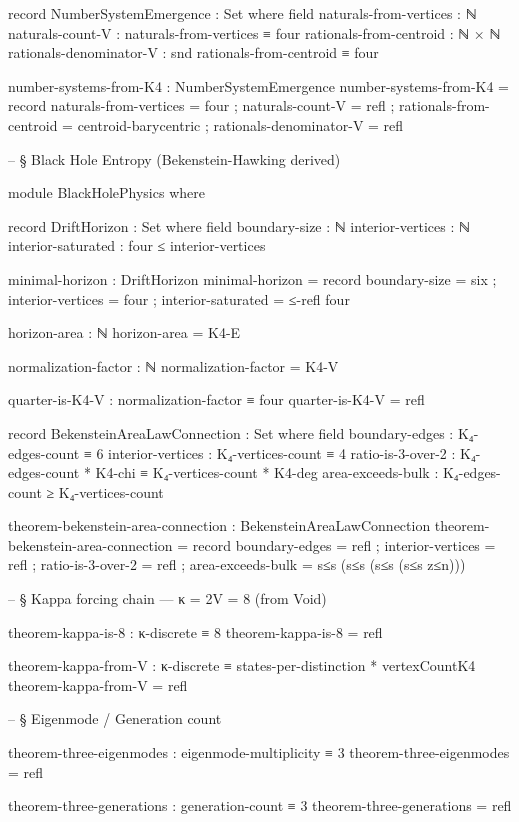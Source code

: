 \documentclass[11pt,a4paper]{book}
\begin{document}
\begin{code}
record NumberSystemEmergence : Set where
  field
    naturals-from-vertices : ℕ
    naturals-count-V : naturals-from-vertices ≡ four
    rationals-from-centroid : ℕ × ℕ
    rationals-denominator-V : snd rationals-from-centroid ≡ four

number-systems-from-K4 : NumberSystemEmergence
number-systems-from-K4 = record
  { naturals-from-vertices = four ; naturals-count-V = refl
  ; rationals-from-centroid = centroid-barycentric ; rationals-denominator-V = refl }

-- § Black Hole Entropy (Bekenstein-Hawking derived)

module BlackHolePhysics where

  record DriftHorizon : Set where
    field
      boundary-size : ℕ
      interior-vertices : ℕ
      interior-saturated : four ≤ interior-vertices

  minimal-horizon : DriftHorizon
  minimal-horizon = record
    { boundary-size = six
    ; interior-vertices = four
    ; interior-saturated = ≤-refl four }

  horizon-area : ℕ
  horizon-area = K4-E

  normalization-factor : ℕ
  normalization-factor = K4-V

  quarter-is-K4-V : normalization-factor ≡ four
  quarter-is-K4-V = refl

record BekensteinAreaLawConnection : Set where
  field
    boundary-edges : K₄-edges-count ≡ 6
    interior-vertices : K₄-vertices-count ≡ 4
    ratio-is-3-over-2 : K₄-edges-count * K4-chi ≡ K₄-vertices-count * K4-deg
    area-exceeds-bulk : K₄-edges-count ≥ K₄-vertices-count

theorem-bekenstein-area-connection : BekensteinAreaLawConnection
theorem-bekenstein-area-connection = record
  { boundary-edges = refl
  ; interior-vertices = refl
  ; ratio-is-3-over-2 = refl
  ; area-exceeds-bulk = s≤s (s≤s (s≤s (s≤s z≤n))) }

-- § Kappa forcing chain — κ = 2V = 8 (from Void)

theorem-kappa-is-8 : κ-discrete ≡ 8
theorem-kappa-is-8 = refl

theorem-kappa-from-V : κ-discrete ≡ states-per-distinction * vertexCountK4
theorem-kappa-from-V = refl

-- § Eigenmode / Generation count

theorem-three-eigenmodes : eigenmode-multiplicity ≡ 3
theorem-three-eigenmodes = refl

theorem-three-generations : generation-count ≡ 3
theorem-three-generations = refl


\end{code}
\end{document}
